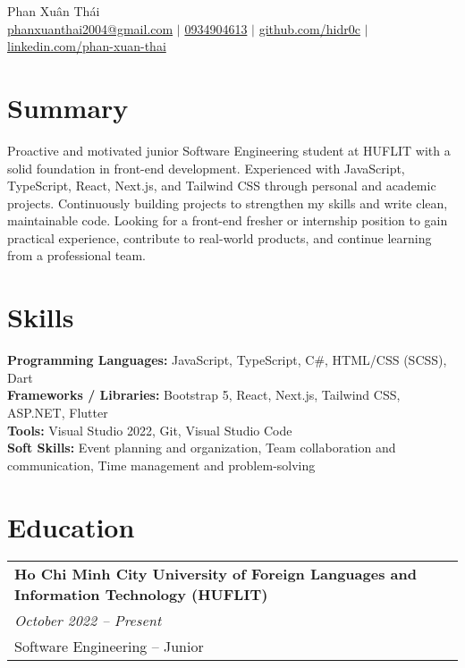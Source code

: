 \documentclass[a4paper,11pt]{article}
\begin{document}
\pagestyle{empty}

\begin{center}
\LARGE{Phan Xuân Thái} \\[5pt]
\small{\href{mailto:phanxuanthai2004@gmail.com}{phanxuanthai2004@gmail.com} $|$ 
\href{tel:0934904613}{0934904613} $|$ 
\href{https://github.com/hidr0c}{github.com/hidr0c} $|$ 
\href{https://www.linkedin.com/in/xuân-thái-phan-bab693352/}{linkedin.com/phan-xuan-thai} 
} \\[2pt]
\end{center}
\vspace{1.5em}

\section{Summary}
\begin{spacing}{1.05}
Proactive and motivated junior Software Engineering student at HUFLIT with a solid foundation in front-end development. Experienced with JavaScript, TypeScript, React, Next.js, and Tailwind CSS through personal and academic projects. Continuously building projects to strengthen my skills and write clean, maintainable code. Looking for a front-end fresher or internship position to gain practical experience, contribute to real-world products, and continue learning from a professional team.
\end{spacing}

\section{Skills}
\begin{spacing}{1.05}
\textbf{Programming Languages:} JavaScript, TypeScript, C\#, HTML/CSS (SCSS), Dart \\
\textbf{Frameworks / Libraries:} Bootstrap 5, React, Next.js, Tailwind CSS, ASP.NET, Flutter \\
\textbf{Tools:} Visual Studio 2022, Git, Visual Studio Code \\
\textbf{Soft Skills:} Event planning and organization, Team collaboration and communication, Time management and problem-solving 
\end{spacing}

\section{Education}
\begin{spacing}{1.05}
\begin{tabularx}{\linewidth}{@{}l@{}}
\textbf{Ho Chi Minh City University of Foreign Languages and Information Technology (HUFLIT)} \\
\normalsize\textit{October 2022 -- Present} \\
Software Engineering -- Junior
\end{tabularx}
\end{spacing}
\end{document}
